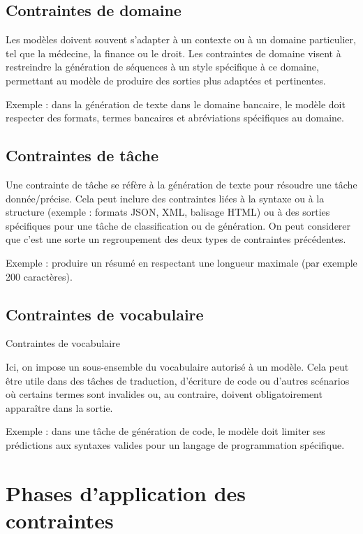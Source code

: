 \documentclass[9pt]{article}
\begin{document}
\subsection{Contraintes de domaine}\label{contraintes-de-domaine}

Les modèles doivent souvent s'adapter à un contexte ou à un domaine particulier, tel que la médecine, la finance ou le droit. 
Les contraintes de domaine visent à restreindre la génération de séquences à un style spécifique à ce domaine, permettant au modèle de produire des sorties plus adaptées et pertinentes. 

Exemple : dans la génération de texte dans le domaine bancaire, le modèle doit respecter des formats, termes bancaires et abréviations spécifiques au domaine.

\subsection{Contraintes de tâche}\label{contraintes-de-tuxe2che}

Une contrainte de tâche se réfère à la génération de texte pour résoudre une tâche donnée/précise. 
Cela peut inclure des contraintes liées à la syntaxe ou à la structure (exemple : formats JSON, XML, balisage HTML) ou à des sorties spécifiques pour une tâche de classification ou de génération. 
On peut considerer que c'est une sorte un regroupement des deux types de contraintes précédentes. 

Exemple : produire un résumé en respectant une longueur maximale (par exemple 200 caractères).

\subsection{Contraintes de vocabulaire}{Contraintes de vocabulaire}\label{contraintes-de-vocabulaire}

Ici, on impose un sous-ensemble du vocabulaire autorisé à un modèle. 
Cela peut être utile dans des tâches de traduction, d'écriture de code ou d'autres scénarios où certains termes sont invalides ou, au contraire, doivent obligatoirement apparaître dans la sortie. 

Exemple : dans une tâche de génération de code, le modèle doit limiter ses prédictions aux syntaxes valides pour un langage de programmation spécifique.

\section{Phases d'application des contraintes}\label{phases-dapplication-des-contraintes}
\end{document}
